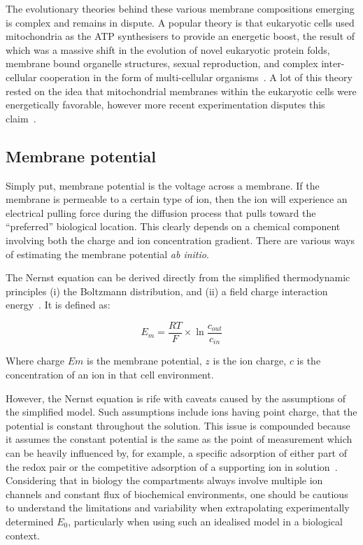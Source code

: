 The evolutionary theories behind these various membrane compositions emerging is complex and remains in dispute.
A popular theory is that eukaryotic cells used mitochondria as the ATP synthesisers to provide an energetic boost, the result of which was a massive shift in the evolution of novel eukaryotic protein folds, membrane bound organelle structures, sexual reproduction, and complex inter-cellular cooperation in the form of multi-cellular organisms~\cite{Lane2005, Lane2015}.
A lot of this theory rested on the idea that mitochondrial membranes within the eukaryotic cells were energetically favorable, however more recent experimentation disputes this claim~\cite{Lynch2017}.

\subsection{Membrane potential}
Simply put, membrane potential is the voltage across a membrane.
If the membrane is permeable to a certain type of ion, then the ion will experience an electrical pulling force during the diffusion process that pulls toward the ``preferred'' biological location.
This clearly depends on a chemical component involving both the charge and ion concentration gradient.
There are various ways of estimating the membrane potential \textit{ab initio}.

The Nernst equation can be derived directly from the simplified thermodynamic principles (i) the Boltzmann distribution, and (ii) a field charge interaction energy~\cite{Feiner1994}.
It is defined as:

\begin{equation}
{E}_{m}=\frac{RT}{F}\times \ln { \frac{{c}_{out}}{{c}_{in}} }
\end{equation}

Where charge $Em$ is the membrane potential, $z$ is the ion charge, $c$ is the concentration of an ion in that cell environment.

However, the Nernst equation is rife with caveats caused by the assumptions of the simplified model.
Such assumptions include ions having point charge, that the potential is constant throughout the solution.
This issue is compounded because it assumes the constant potential is the same as the point of measurement which can be heavily influenced by, for example, a specific adsorption of either part of the redox pair or the competitive adsorption of a supporting ion in solution~\cite{Feiner1994}.
Considering that in biology the compartments always  involve multiple ion channels and constant flux of biochemical environments, one should be cautious to understand the limitations and variability when extrapolating experimentally determined ${E}_{0}$, particularly when using such an idealised model in a biological context.

